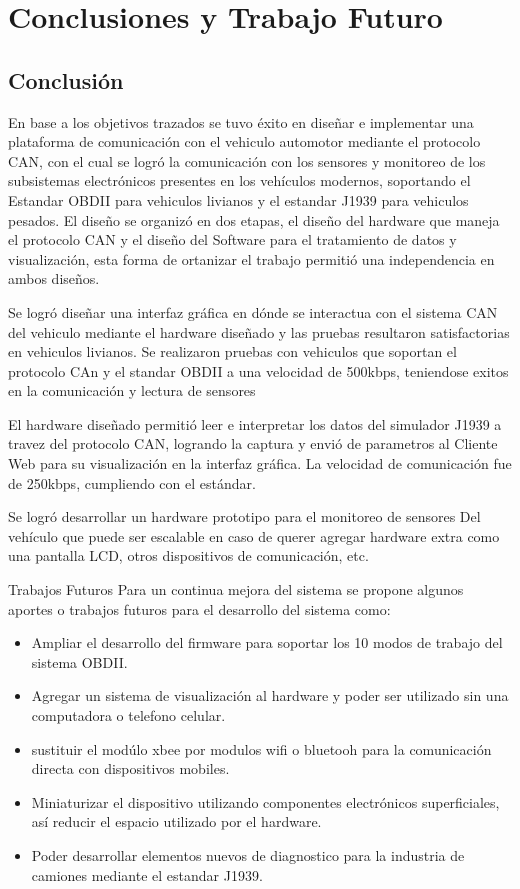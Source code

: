 \chapter[Capítulo 5. Conclusiones y Trabajo Futuro]{Conclusiones y Trabajo Futuro}
\section{Conclusión}

En base  a los objetivos trazados se tuvo éxito en diseñar e implementar una plataforma de comunicación con el vehiculo automotor mediante el protocolo CAN, con el cual se logró la comunicación con los sensores y monitoreo de los subsistemas electrónicos presentes en los vehículos modernos, soportando el Estandar OBDII para vehiculos livianos y el estandar J1939 para vehiculos pesados. El diseño se organizó en dos etapas, el diseño del hardware que maneja el protocolo CAN y el diseño del Software para el tratamiento de datos y visualización, esta forma de ortanizar el trabajo permitió una independencia en ambos diseños. 

Se logró diseñar una interfaz gráfica en dónde se interactua con el sistema CAN del vehiculo mediante el hardware diseñado y las pruebas resultaron satisfactorias en vehiculos livianos. Se realizaron pruebas con vehiculos que soportan el protocolo CAn y el standar OBDII a una velocidad de 500kbps, teniendose exitos en la comunicación y lectura de sensores


El hardware diseñado permitió leer e interpretar los datos  del simulador J1939 a travez del protocolo CAN, logrando la captura y envió de parametros al Cliente Web para su visualización en la interfaz gráfica. La velocidad de comunicación fue de  250kbps, cumpliendo con el estándar. 

Se logró desarrollar un hardware prototipo para el monitoreo de sensores Del vehículo que puede ser escalable en caso de querer agregar hardware extra como una pantalla LCD, otros dispositivos de comunicación, etc. 

Trabajos Futuros
Para un continua mejora del sistema se propone algunos aportes o trabajos futuros para el desarrollo del sistema como: 
\begin{itemize}
    \item Ampliar el desarrollo del firmware para soportar los 10 modos de trabajo del sistema OBDII. 
    \item Agregar un sistema de visualización al hardware y poder ser utilizado sin una computadora o telefono celular. 
    \item sustituir el modúlo xbee por modulos wifi o bluetooh para la comunicación directa con dispositivos mobiles. 
    \item Miniaturizar el dispositivo utilizando componentes electrónicos superficiales, así reducir el espacio utilizado por el hardware. 
    \item Poder desarrollar elementos nuevos de diagnostico para la industria de camiones mediante el estandar J1939. 
\end{itemize}






	

	

	

